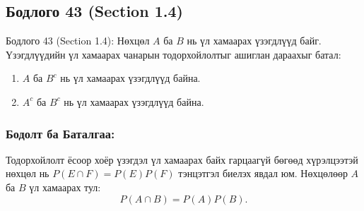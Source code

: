 \documentclass[11pt,a4paper]{article}
\begin{document}
\subsection*{Бодлого 43 (Section 1.4)}

\begin{problembox}{Бодлого 43 (Section 1.4): Нөхцөл}
$A$ ба $B$ нь үл хамаарах үзэгдлүүд байг. Үзэгдлүүдийн үл хамаарах чанарын тодорхойлолтыг ашиглан дараахыг батал:
\begin{enumerate}[label=\textbf{(\alph*)}, leftmargin=1.8em, itemsep=1pt]
  \item $A$ ба $B^c$ нь үл хамаарах үзэгдлүүд байна.
  \item $A^c$ ба $B^c$ нь үл хамаарах үзэгдлүүд байна.
\end{enumerate}
\end{problembox}

\subsubsection*{Бодолт ба Баталгаа:}

Тодорхойлолт ёсоор хоёр үзэгдэл үл хамаарах байх гарцаагүй бөгөөд хүрэлцээтэй нөхцөл нь $P(E \cap F) = P(E)P(F)$ тэнцэтгэл биелэх явдал юм.
Нөхцөлөөр $A$ ба $B$ үл хамаарах тул:
\[
  P(A \cap B) = P(A)P(B).
\]
\end{document}
